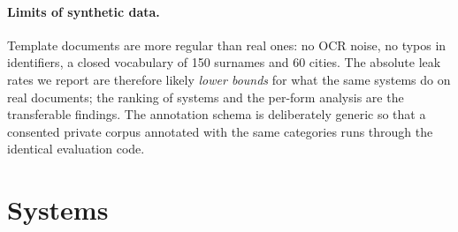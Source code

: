 \documentclass[11pt,a4paper]{article}
\begin{document}
\paragraph{Limits of synthetic data.} Template documents are more regular than real ones: no OCR noise, no typos in identifiers, a closed vocabulary of 150 surnames and 60 cities. The absolute leak rates we report are therefore likely \emph{lower bounds} for what the same systems do on real documents; the ranking of systems and the per-form analysis are the transferable findings. The annotation schema is deliberately generic so that a consented private corpus annotated with the same categories runs through the identical evaluation code.

\section{Systems}
\label{sec:systems}
\end{document}
